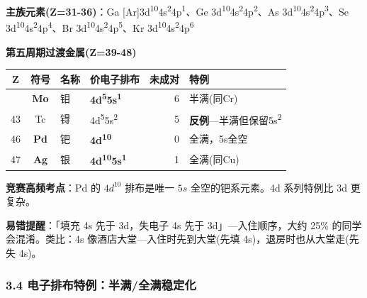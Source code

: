 \textbf{主族元素(Z=31-36)}：Ga {[}Ar{]}3d\textsuperscript{10}4s\textsuperscript{2}4p\textsuperscript{1}、Ge 3d\textsuperscript{10}4s\textsuperscript{2}4p\textsuperscript{2}、As 3d\textsuperscript{10}4s\textsuperscript{2}4p\textsuperscript{3}、Se 3d\textsuperscript{10}4s\textsuperscript{2}4p\textsuperscript{4}、Br 3d\textsuperscript{10}4s\textsuperscript{2}4p\textsuperscript{5}、Kr 3d\textsuperscript{10}4s\textsuperscript{2}4p\textsuperscript{6}

\textbf{第五周期过渡金属(Z=39-48)}

{\def\LTcaptype{none} %
\begin{longtable}[]{@{}ccllrl@{}}
\toprule\noalign{}
Z & 符号 & 名称 & 价电子排布 & 未成对 & 特例 \\
\midrule\noalign{}
\endhead
\bottomrule\noalign{}
\endlastfoot
42 & \textbf{Mo} & 钼 & \textbf{4d\textsuperscript{5}5s\textsuperscript{1}} & 6 & 半满(同Cr) \\
43 & Tc & 锝 & 4d\textsuperscript{5}5s\textsuperscript{2} & 5 & \textbf{反例}---半满但保留5s\textsuperscript{2} \\
46 & \textbf{Pd} & 钯 & \textbf{4d\textsuperscript{10}} & 0 & 全满，5s全空 \\
47 & \textbf{Ag} & 银 & \textbf{4d\textsuperscript{10}5s\textsuperscript{1}} & 1 & 全满(同Cu) \\
\end{longtable}
}

\textbf{竞赛高频考点}：Pd 的 \(4d^{10}\) 排布是唯一 \(5s\) 全空的钯系元素。4d 系列特例比 3d 更复杂。

\textbf{易错提醒}：「填充 4s 先于 3d，失电子 4s 先于 3d」---入住顺序，大约 25\% 的同学会混淆。类比：4s 像酒店大堂---入住时先到大堂(先填 4s)，退房时也从大堂走(先失 4s)。

\subsubsection{3.4 电子排布特例：半满/全满稳定化}\label{ux7535ux5b50ux6392ux5e03ux7279ux4f8bux534aux6ee1ux5168ux6ee1ux7a33ux5b9aux5316}

